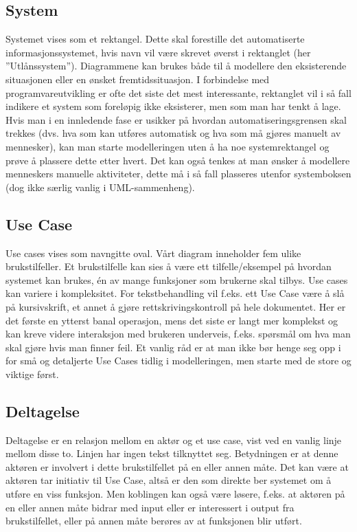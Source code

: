 \subsection{System}

Systemet vises som et rektangel. Dette skal forestille det automatiserte informasjonssystemet, hvis navn vil være skrevet øverst i rektanglet (her ”Utlånssystem”). Diagrammene kan brukes både til å modellere den eksisterende situasjonen eller en ønsket fremtidssituasjon. I forbindelse med programvareutvikling er ofte det siste det mest interessante, rektanglet vil i så fall indikere et system som foreløpig ikke eksisterer, men som man har tenkt å lage. Hvis man i en innledende fase er usikker på hvordan automatiseringsgrensen skal trekkes (dvs. hva som kan utføres automatisk og hva som må gjøres manuelt av mennesker), kan man starte modelleringen uten å ha noe systemrektangel og prøve å plassere dette etter hvert. Det kan også tenkes at man ønsker å modellere menneskers manuelle aktiviteter, dette må i så fall plasseres utenfor systemboksen (dog ikke særlig vanlig i UML-sammenheng).

\subsection{Use Case}

Use cases vises som navngitte oval. Vårt diagram inneholder fem ulike brukstilfeller. Et brukstilfelle kan sies å være ett tilfelle/eksempel på hvordan systemet kan brukes, én av mange funksjoner som brukerne skal tilbys. Use cases kan variere i kompleksitet. For tekstbehandling vil f.eks. ett Use Case være å slå på kursivskrift, et annet å gjøre rettskrivingskontroll på hele dokumentet. Her er det første en ytterst banal operasjon, mens det siste er langt mer komplekst og kan kreve videre interaksjon med brukeren underveis, f.eks. spørsmål om hva man skal gjøre hvis man finner feil. Et vanlig råd er at man ikke bør henge seg opp i for små og detaljerte Use Cases tidlig i modelleringen, men starte med de store og viktige først.

\subsection{Deltagelse}

Deltagelse er en relasjon mellom en aktør og et use case, vist ved en vanlig linje mellom disse to. Linjen har ingen tekst tilknyttet seg. Betydningen er at denne aktøren er involvert i dette brukstilfellet på en eller annen måte. Det kan være at aktøren tar initiativ til Use Case, altså er den som direkte ber systemet om å utføre en viss funksjon. Men koblingen kan også være løsere, f.eks. at aktøren på en eller annen måte bidrar med input eller er interessert i output fra brukstilfellet, eller på annen måte berøres av at funksjonen blir utført.

